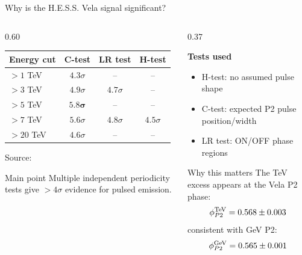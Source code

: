 \documentclass[aspectratio=1610,9pt]{beamer}
\newcommand{\imgsource}[1]{%
  \vspace{0.04cm}%
  {\tiny Source: #1}%
}
\begin{document}
\begin{frame}{Why is the H.E.S.S. Vela signal significant?}

  \begin{columns}[T,onlytextwidth]

    \begin{column}{0.60\textwidth}
      \centering
      \renewcommand{\arraystretch}{1.25}
      \normalsize
      \begin{tabular}{l c c c}
        \toprule
        \textbf{Energy cut} & \textbf{C-test} & \textbf{LR test} & \textbf{H-test} \\
        \midrule
        $>1$ TeV  & $4.3\sigma$ & -- & -- \\
        $>3$ TeV  & $4.9\sigma$ & $4.7\sigma$ & -- \\
        $>5$ TeV  & $\mathbf{5.8\sigma}$ & -- & -- \\
        $>7$ TeV  & $5.6\sigma$ & $4.8\sigma$ & $4.5\sigma$ \\
        $>20$ TeV & $4.6\sigma$ & -- & -- \\
        \bottomrule
      \end{tabular}
      \imgsource{\cite{hessVela2023}}

      \vspace{0.35cm}

      \begin{block}{Main point}
        Multiple independent periodicity tests give $>4\sigma$ evidence for pulsed emission.
      \end{block}

    \end{column}

    \begin{column}{0.37\textwidth}
      \small

      \textbf{Tests used}
      \vspace{0.1cm}

      \begin{itemize}
        \item H-test: no assumed pulse shape
        \item C-test: expected P2 pulse position/width
        \item LR test: ON/OFF phase regions
      \end{itemize}

      \vspace{0.25cm}

      \begin{block}{Why this matters}
      The TeV excess appears at the Vela P2 phase:
      \[
      \phi^{\rm TeV}_{P2}=0.568\pm0.003
      \]
      consistent with GeV P2:
      \[
      \phi^{\rm GeV}_{P2}=0.565\pm0.001
      \]
      \end{block}

    \end{column}

  \end{columns}

\end{frame}
\end{document}
